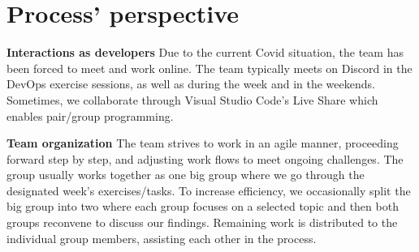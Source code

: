 \section{Process' perspective}

\textbf{Interactions as developers}\newline
  Due to the current Covid situation, the team has been forced to meet and work online. The team typically meets on Discord in the DevOps
  exercise sessions, as well as during the week and in the weekends. Sometimes, we collaborate through Visual Studio Code's Live Share which enables pair/group programming.%
  \newline
 
\textbf{Team organization}\newline
  The team strives to work in an agile manner, proceeding forward step by step, and adjusting work flows to meet ongoing challenges. The group usually works together as one big group where we go through the designated week's exercises/tasks. 
  To increase efficiency, we occasionally split the big group into two where each group focuses on a selected topic
  and then both groups reconvene to discuss our findings. Remaining work is distributed to the individual group members, assisting each other in the process.

